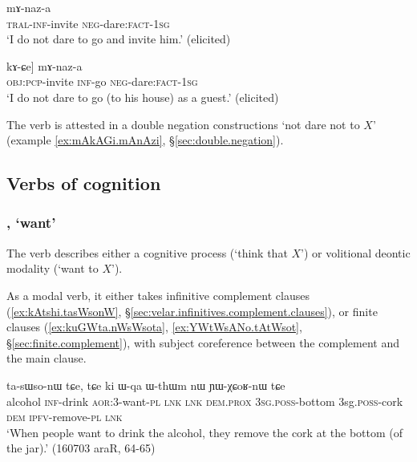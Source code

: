 \begin{exe}
\ex \label{ex:CWkAnAkhu.mAnaza}
\gll  [ɕɯ-kɤ-nɤkʰu] mɤ-naz-a \\
\textsc{tral}-\textsc{inf}-invite \textsc{neg}-dare:\textsc{fact}-\textsc{1sg} \\
\glt `I do not dare to go and invite him.' (elicited)
\end{exe}


\begin{exe}
\ex \label{ex:kAnAkhu.kACe.mAnaza}
\gll [[kɤ-nɤkʰu] kɤ-ɕe] mɤ-naz-a \\
\textsc{obj}:\textsc{pcp}-invite \textsc{inf}-go \textsc{neg}-dare:\textsc{fact}-\textsc{1sg} \\
\glt `I do not dare to go (to his house) as a guest.' (elicited)
\end{exe}

The verb  is attested in a double negation constructions `not dare not to $X$' (example \ref{ex:mAkAGi.mAnAzi}, §\ref{sec:double.negation}).

 \subsection{Verbs of cognition}

 \subsubsection{, `want'} \label{sec:sWso.complement}
 The verb  describes either a cognitive process (`think that $X$') or volitional deontic modality (`want to $X$').

As a modal verb, it either takes infinitive complement clauses (\ref{ex:kAtshi.tasWsonW}, §\ref{sec:velar.infinitives.complement.clauses}), or finite clauses (\ref{ex:kuGWta.nWsWsota}, \ref{ex:YWtWsANo.tAtWsot}, §\ref{sec:finite.complement}), with subject coreference between the complement and the main clause.  
 
\begin{exe}
\ex \label{ex:kAtshi.tasWsonW}
 ta-sɯso-nɯ tɕe, tɕe ki ɯ-qa ɯ-thɯm nɯ ɲɯ-χɕoʁ-nɯ tɕe \\
alcohol \textsc{inf}-drink \textsc{aor}:3\flobv{}-want-\textsc{pl} \textsc{lnk} \textsc{lnk} \textsc{dem}.\textsc{prox} \textsc{3sg}.\textsc{poss}-bottom {3sg}.\textsc{poss}-cork \textsc{dem} \textsc{ipfv}-remove-\textsc{pl} \textsc{lnk} \\
\glt `When people want to drink the alcohol, they remove the cork at the bottom (of the jar).' (160703 araR, 64-65)
\end{exe}

